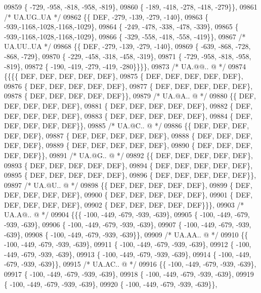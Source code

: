 \begin{DoxyCode}
09859 \{ -729, -958, -818, -958, -819\},
09860 \{ -189, -418, -278, -418, -279\}\},
09861 \textcolor{comment}{/* UA.UG..UA */}
09862 \{\{  DEF, -279, -139, -279, -140\},
09863 \{ -939,-1168,-1028,-1168,-1029\},
09864 \{ -249, -478, -338, -478, -339\},
09865 \{ -939,-1168,-1028,-1168,-1029\},
09866 \{ -329, -558, -418, -558, -419\}\},
09867 \textcolor{comment}{/* UA.UU..UA */}
09868 \{\{  DEF, -279, -139, -279, -140\},
09869 \{ -639, -868, -728, -868, -729\},
09870 \{ -229, -458, -318, -458, -319\},
09871 \{ -729, -958, -818, -958, -819\},
09872 \{ -190, -419, -279, -419, -280\}\}\}\},
09873 \textcolor{comment}{/* UA.@@.. @ */}
09874 \{\{\{\{  DEF,  DEF,  DEF,  DEF,  DEF\},
09875 \{  DEF,  DEF,  DEF,  DEF,  DEF\},
09876 \{  DEF,  DEF,  DEF,  DEF,  DEF\},
09877 \{  DEF,  DEF,  DEF,  DEF,  DEF\},
09878 \{  DEF,  DEF,  DEF,  DEF,  DEF\}\},
09879 \textcolor{comment}{/* UA.@A.. @ */}
09880 \{\{  DEF,  DEF,  DEF,  DEF,  DEF\},
09881 \{  DEF,  DEF,  DEF,  DEF,  DEF\},
09882 \{  DEF,  DEF,  DEF,  DEF,  DEF\},
09883 \{  DEF,  DEF,  DEF,  DEF,  DEF\},
09884 \{  DEF,  DEF,  DEF,  DEF,  DEF\}\},
09885 \textcolor{comment}{/* UA.@C.. @ */}
09886 \{\{  DEF,  DEF,  DEF,  DEF,  DEF\},
09887 \{  DEF,  DEF,  DEF,  DEF,  DEF\},
09888 \{  DEF,  DEF,  DEF,  DEF,  DEF\},
09889 \{  DEF,  DEF,  DEF,  DEF,  DEF\},
09890 \{  DEF,  DEF,  DEF,  DEF,  DEF\}\},
09891 \textcolor{comment}{/* UA.@G.. @ */}
09892 \{\{  DEF,  DEF,  DEF,  DEF,  DEF\},
09893 \{  DEF,  DEF,  DEF,  DEF,  DEF\},
09894 \{  DEF,  DEF,  DEF,  DEF,  DEF\},
09895 \{  DEF,  DEF,  DEF,  DEF,  DEF\},
09896 \{  DEF,  DEF,  DEF,  DEF,  DEF\}\},
09897 \textcolor{comment}{/* UA.@U.. @ */}
09898 \{\{  DEF,  DEF,  DEF,  DEF,  DEF\},
09899 \{  DEF,  DEF,  DEF,  DEF,  DEF\},
09900 \{  DEF,  DEF,  DEF,  DEF,  DEF\},
09901 \{  DEF,  DEF,  DEF,  DEF,  DEF\},
09902 \{  DEF,  DEF,  DEF,  DEF,  DEF\}\}\},
09903 \textcolor{comment}{/* UA.A@.. @ */}
09904 \{\{\{ -100, -449, -679, -939, -639\},
09905 \{ -100, -449, -679, -939, -639\},
09906 \{ -100, -449, -679, -939, -639\},
09907 \{ -100, -449, -679, -939, -639\},
09908 \{ -100, -449, -679, -939, -639\}\},
09909 \textcolor{comment}{/* UA.AA.. @ */}
09910 \{\{ -100, -449, -679, -939, -639\},
09911 \{ -100, -449, -679, -939, -639\},
09912 \{ -100, -449, -679, -939, -639\},
09913 \{ -100, -449, -679, -939, -639\},
09914 \{ -100, -449, -679, -939, -639\}\},
09915 \textcolor{comment}{/* UA.AC.. @ */}
09916 \{\{ -100, -449, -679, -939, -639\},
09917 \{ -100, -449, -679, -939, -639\},
09918 \{ -100, -449, -679, -939, -639\},
09919 \{ -100, -449, -679, -939, -639\},
09920 \{ -100, -449, -679, -939, -639\}\},

\end{DoxyCode}

